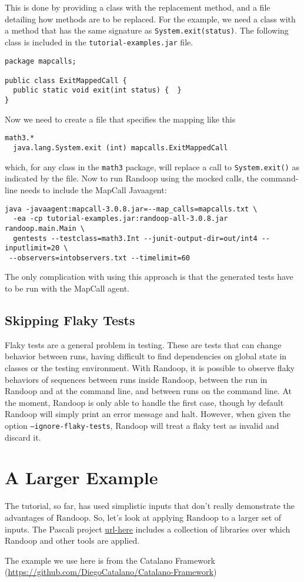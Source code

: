 \documentclass[11pt, oneside]{article} %
\newcommand{\code}[1]{{\texttt{#1}}}
\newcommand{\cmd}[1]{{\texttt{#1}}}
\begin{document}
This is done by providing a class with the replacement method, and a file detailing how methods are to be replaced.
For the example, we need a class with a method that has the same signature as \code{System.exit(status)}.
The following class is included in the \texttt{tutorial-examples.jar} file.
\vfill\pagebreak
\begin{verbatim}
package mapcalls;

public class ExitMappedCall {
  public static void exit(int status) {  }
}
\end{verbatim}
Now we need to create a file that specifies the mapping like this
\begin{verbatim}
math3.*
  java.lang.System.exit (int) mapcalls.ExitMappedCall
\end{verbatim}
which, for any class in the \code{math3} package, will replace a call to \code{System.exit()} as indicated by the file. Now to run Randoop using the mocked calls, the command-line needs to include the MapCall Javaagent:
\begin{verbatim}
java -javaagent:mapcall-3.0.8.jar=--map_calls=mapcalls.txt \
  -ea -cp tutorial-examples.jar:randoop-all-3.0.8.jar randoop.main.Main \
  gentests --testclass=math3.Int --junit-output-dir=out/int4 --inputlimit=20 \
 --observers=intobservers.txt --timelimit=60
\end{verbatim}
The only complication with using this approach is that the generated tests have to be run with the MapCall agent.


\subsection{Skipping Flaky Tests}
Flaky tests are a general problem in testing.
These are tests that can change behavior between runs, having difficult to find dependencies on global state in classes or the testing environment. 
With Randoop, it is possible to observe flaky behaviors of sequences between runs inside Randoop, between the run in Randoop and at the command line, and between runs on the command line.
At the moment, Randoop is only able to handle the first case, though by default Randoop will simply print an error message and halt.
However, when given the option \cmd{--ignore-flaky-tests}, Randoop will treat a flaky test as invalid and discard it.

\section{A Larger Example}
The tutorial, so far, has used simplistic inputs that don't really demonstrate the advantages of Randoop. 
So, let's look at applying Randoop to a larger set of inputs.
The Pascali project \url{url-here} includes a collection of libraries over which Randoop and other tools are applied. 

The example we use here is from the Catalano Framework (\url{https://github.com/DiegoCatalano/Catalano-Framework})
\end{document}
